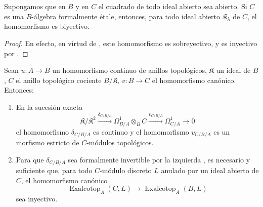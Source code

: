 \begin{corollary}[20.7.7]
\label{0.20.7.7-fr}
Supongamos que en $B$ y en $C$ el cuadrado de todo ideal abierto sea abierto.
Si $C$ es una $B$-álgebra formalmente étale, entonces, para todo ideal abierto
$\mathfrak{K}_\lambda$ de $C$, el homomorfismo  es
biyectivo.
\end{corollary}

\begin{proof}
En efecto, en virtud de , este homomorfismo es sobreyectivo, y
es inyectivo por .
\end{proof}

\begin{proposition}[20.7.8]
\label{0.20.7.8-fr}
Sean $u:A\to B$ un homomorfismo continuo de anillos topológicos,
$\mathfrak{K}$ un ideal de $B$, $C$ el anillo topológico cociente
$B/\mathfrak{K}$, $v:B\to C$ el homomorfismo canónico. Entonces:
\begin{enumerate}
  \item[\rm(i)] En la sucesión exacta 
\[
  \mathfrak{K}/\mathfrak{K}^2\xrightarrow{\delta_{C/B/A}}
  \Omega^1_{B/A}\otimes_B C\xrightarrow{v_{C/B/A}}\Omega^1_{C/A}\to0
\]
el homomorfismo $\delta_{C/B/A}$ es continuo y el homomorfismo $v_{C/B/A}$
es un morfismo estricto de $C$-módulos topológicos.
  \item[\rm(ii)] Para que $\delta_{C/B/A}$ sea formalmente invertible por la
izquierda , es necesario y suficiente que, para todo $C$-módulo
discreto $L$ anulado por un ideal abierto de $C$, el homomorfismo canónico
\begin{equation}
\tag{20.7.8.1}
\label{0.20.7.8.1-fr}
  \operatorname{Exalcotop}_A(C,L)\to\operatorname{Exalcotop}_A(B,L)
\end{equation}
sea inyectivo.
\end{enumerate}
\end{proposition}

